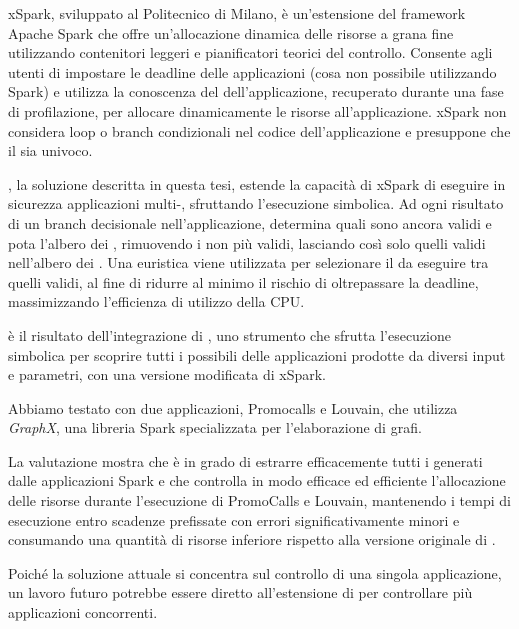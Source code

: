 xSpark, sviluppato al Politecnico di Milano, è un'estensione del framework Apache Spark che offre un'allocazione dinamica delle risorse a grana fine utilizzando contenitori leggeri e pianificatori teorici del controllo. Consente agli utenti di impostare le deadline delle applicazioni (cosa non  possibile utilizzando Spark) e utilizza la conoscenza del \plan dell'applicazione, recuperato durante una fase di profilazione, per allocare dinamicamente le risorse all'applicazione.
xSpark non considera loop o branch condizionali nel codice dell'applicazione e presuppone che il  \plan sia univoco.

\tool, la soluzione descritta in questa tesi, estende la capacità di xSpark di eseguire in sicurezza applicazioni multi-\plan, sfruttando l'esecuzione simbolica. Ad ogni risultato di un branch decisionale nell'applicazione, \tool determina quali \plans sono ancora validi e pota l'albero dei \plans, rimuovendo i \plans non più validi, lasciando così solo quelli validi nell'albero dei \plans. Una euristica viene utilizzata per selezionare il \plan da eseguire tra quelli validi, al fine di ridurre al minimo il rischio di oltrepassare la deadline, massimizzando l'efficienza di utilizzo della CPU.

\tool è il risultato dell'integrazione di \dSymb, uno strumento che sfrutta l'esecuzione simbolica per scoprire tutti i possibili {\plan} delle applicazioni prodotte da diversi input e parametri, con una versione modificata di xSpark.

Abbiamo testato \tool con due applicazioni, Promocalls e Louvain, che utilizza \textit{GraphX}, una libreria Spark specializzata per l'elaborazione di grafi.

La valutazione mostra che \approach è in grado di estrarre efficacemente tutti i \plans generati dalle applicazioni Spark e che \tool controlla in modo efficace ed efficiente l'allocazione delle risorse durante l'esecuzione di PromoCalls e Louvain, mantenendo i tempi di esecuzione entro scadenze prefissate con errori significativamente minori e consumando una quantità di risorse inferiore rispetto alla versione originale di \cSpark.

Poiché la soluzione attuale si concentra sul controllo di una singola applicazione, un lavoro futuro potrebbe essere diretto all'estensione di \tool per controllare più applicazioni concorrenti.

\endgroup


